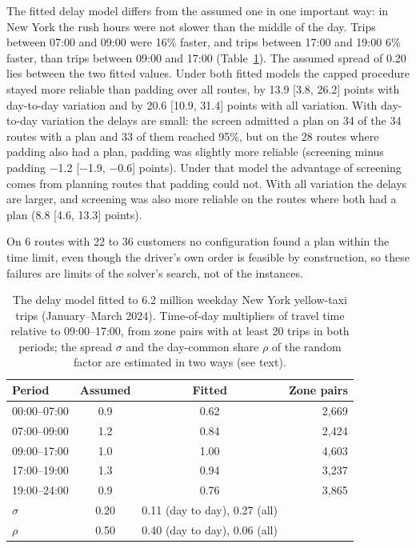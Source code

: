 \documentclass[12pt,letterpaper]{article}
\begin{document}
The fitted delay model differs from the assumed one in one important way: in New
York the rush hours were not slower than the middle of the day. Trips between
07:00 and 09:00 were 16\% faster, and trips between 17:00 and 19:00
6\% faster, than trips between 09:00 and 17:00 (Table~\ref{tab:nyc}). The
assumed spread of 0.20 lies between the two fitted values. Under both fitted models
the capped procedure stayed more reliable than padding over all routes, by
13.9 [3.8, 26.2] points with day-to-day variation
and by 20.6 [10.9, 31.4] points with all variation.
With day-to-day variation the delays are small: the screen admitted a plan on
34 of the 34 routes with a plan and
33 of them reached 95\%, but on the 28 routes
where padding also had a plan, padding was slightly more reliable (screening minus
padding $-$1.2 [$-$1.9, $-$0.6] points). Under that
model the advantage of screening comes from planning routes that padding could
not. With all variation the delays are larger, and screening was also more
reliable on the routes where both had a plan (8.8 [4.6,
13.3] points).

On 6 routes with 22 to 36 customers no
configuration found a plan within the time limit, even though the driver's own
order is feasible by construction, so these failures are limits of the solver's
search, not of the instances.

\begin{table}[t]
\centering
\small
\caption{The delay model fitted to 6.2 million weekday New York yellow-taxi trips (January--March 2024). Time-of-day multipliers of travel time relative to 09:00--17:00, from zone pairs with at least 20 trips in both periods; the spread $\sigma$ and the day-common share $\rho$ of the random factor are estimated in two ways (see text).}
\label{tab:nyc}
\begin{tabular}{@{}lccr@{}}
\toprule
Period & Assumed & Fitted & Zone pairs\\
\midrule
00:00--07:00 & 0.9 & 0.62 & 2{,}669\\
07:00--09:00 & 1.2 & 0.84 & 2{,}424\\
09:00--17:00 & 1.0 & 1.00 & 4{,}603\\
17:00--19:00 & 1.3 & 0.94 & 3{,}237\\
19:00--24:00 & 0.9 & 0.76 & 3{,}865\\
\midrule
$\sigma$ & 0.20 & 0.11 (day to day), 0.27 (all) & \\
$\rho$ & 0.50 & 0.40 (day to day), 0.06 (all) & \\
\bottomrule
\end{tabular}
\end{table}
\end{document}

